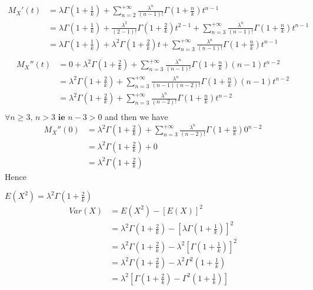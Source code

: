 \documentclass[11pt]{article}
\def\gt{>}
\begin{document}
\begin{align*}
M_X'(t)  
         &=\lambda \Gamma(1+\frac{1}{k})+\sum_{n=2}^{+\infty} \frac{{\lambda }^n}{(n-1)!} \Gamma(1+\frac{n}{k})t^{n-1} \\
         &=\lambda \Gamma(1+\frac{1}{k})+\frac{{\lambda }^2}{(2-1)!} \Gamma(1+\frac{2}{k})t^{2-1}+\sum_{n=3}^{+\infty} \frac{{\lambda }^n}{(n-1)!} \Gamma(1+\frac{n}{k})t^{n-1} \\
         &=\lambda \Gamma(1+\frac{1}{k})+{\lambda }^2 \Gamma(1+\frac{2}{k})t+\sum_{n=3}^{+\infty} \frac{{\lambda }^n}{(n-1)!} \Gamma(1+\frac{n}{k})t^{n-1} \\
\end{align*}
\begin{align*}
M_X''(t)  
         &=0+{\lambda }^2 \Gamma(1+\frac{2}{k})+\sum_{n=3}^{+\infty} \frac{{\lambda }^n}{(n-1)!} \Gamma(1+\frac{n}{k})(n-1)t^{n-2} \\
         &={\lambda }^2 \Gamma(1+\frac{2}{k})+\sum_{n=3}^{+\infty} \frac{{\lambda }^n}{(n-1)(n-2)!} \Gamma(1+\frac{n}{k})(n-1)t^{n-2} \\
         &={\lambda }^2 \Gamma(1+\frac{2}{k})+\sum_{n=3}^{+\infty} \frac{{\lambda }^n}{(n-2)!} \Gamma(1+\frac{n}{k})t^{n-2} \\
\end{align*}
$\forall n \geq 3 \textbf{, } n\gt 3 \textbf{ ie }  n-3 \gt 0$ and then we have
\begin{align*}
M_X''(0)  
         &={\lambda }^2 \Gamma(1+\frac{2}{k})+\sum_{n=3}^{+\infty} \frac{{\lambda }^n}{(n-2)!} \Gamma(1+\frac{n}{k})0^{n-2} \\
         &={\lambda }^2 \Gamma(1+\frac{2}{k})+0 \\
         &={\lambda }^2 \Gamma(1+\frac{2}{k})
\end{align*}
Hence 

$E(X^2)={\lambda }^2 \Gamma(1+\frac{2}{k})$
\begin{align*}
Var(X)  
         &=E(X^2)-[E(X)]^2\\
         &={\lambda }^2 \Gamma(1+\frac{2}{k})-[\lambda \Gamma(1+\frac{1}{k})]^2\\
         &={\lambda }^2 \Gamma(1+\frac{2}{k})-\lambda^2 [\Gamma(1+\frac{1}{k})]^2\\
         &={\lambda }^2 \Gamma(1+\frac{2}{k})-\lambda^2 \Gamma^2(1+\frac{1}{k})\\
         &={\lambda }^2[ \Gamma(1+\frac{2}{k})- \Gamma^2(1+\frac{1}{k})]\\
\end{align*}
\end{document}
